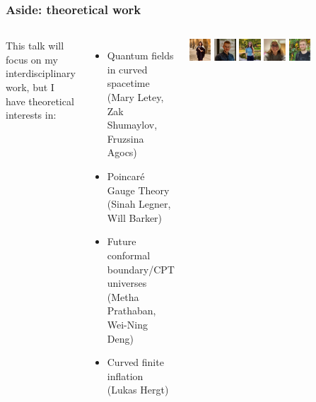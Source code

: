 \documentclass[aspectratio=169]{beamer}
\begin{document}
\begin{frame}
    \frametitle{Aside: theoretical work}
    \begin{columns}

        This talk will focus on my interdisciplinary work, but I have theoretical interests in:
        \begin{itemize}
            \item Quantum fields in curved spacetime \\\hfill {\small (Mary Letey, Zak Shumaylov, Fruzsina Agocs)}
            \item Poincar\'{e} Gauge Theory \\\hfill {\small (Sinah Legner, Will Barker)}
            \item Future conformal boundary/CPT universes \\\hfill {\small (Metha Prathaban, Wei-Ning Deng)}
            \item Curved finite inflation \hfill {\small (Lukas Hergt)}
        \end{itemize}
        \includegraphics[width=0.125\textwidth]{figures/students/mary_letey.jpg}%
        \includegraphics[width=0.125\textwidth]{figures/students/zak_shumaylov.jpg}%
        \includegraphics[width=0.125\textwidth]{figures/students/fruzsina_agocs.jpg}%
        \includegraphics[width=0.125\textwidth]{figures/students/sinah_legner.jpg}%
        \includegraphics[width=0.125\textwidth]{figures/students/will_barker.jpg}%

\end{columns}
\end{frame}
\end{document}
